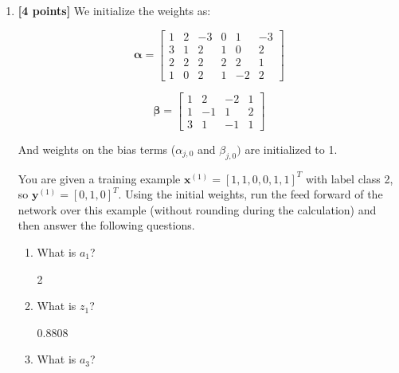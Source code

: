\documentclass[11pt]{article}
\numberwithin{equation}{section} %
\numberwithin{figure}{section} %
\numberwithin{table}{section} %
\newcommand{\xv}{\mathbf{x}}
\newcommand{\yv}{\mathbf{y}}
\newcommand{\points}[1]{{\bf [#1 points]}}
\begin{document}
\begin{enumerate} 
\item \points{4}
     We initialize the weights as:
\begin{center}
$$\boldsymbol{\alpha}=
    \begin{bmatrix}
    1 & 2 & -3 & 0 & 1 & -3 \\
    3 & 1 & 2 & 1 & 0 & 2 \\
    2 & 2 & 2 & 2 & 2 & 1 \\
    1 & 0 & 2 & 1 & -2 & 2
    \end{bmatrix}$$
    
$$\boldsymbol{\beta}=
    \begin{bmatrix}
    1 & 2 & -2 & 1 \\
    1 & -1 & 1 & 2 \\
    3 & 1 & -1 & 1
    \end{bmatrix}
$$
\end{center}
    
And weights on the bias terms (${\alpha}_{j,0}$ and ${\beta}_{j,0})$ are initialized to 1.
    
    You are given a training example $\xv^{(1)}=[1,1,0,0,1,1]^T$ with label class 2, so $\yv^{(1)}=[0,1,0]^T$. Using the initial weights, run the feed forward of the network over this example (without rounding during the calculation) and then answer the following questions. 
    
    \begin{enumerate}
        \item What is $a_1$?
        
        \begin{tcolorbox}[fit,height=1cm, width=2cm, blank, borderline={1pt}{-2pt}]
            2
        \end{tcolorbox}
        
        
        \item What is $z_1$?
        
        \begin{tcolorbox}[fit,height=1cm, width=2cm, blank, borderline={1pt}{-2pt}]
            0.8808 
        \end{tcolorbox}
        
        
        \item What is $a_3$?
        

\end{enumerate}
\end{enumerate}
\end{document}
